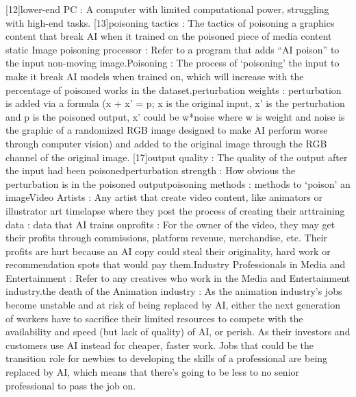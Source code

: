 [12]lower-end PC : A computer with limited computational power, struggling with high-end tasks.
[13]poisoning tactics : The tactics of poisoning a graphics content that break AI when it trained on the poisoned piece of media content \newline
[14]static Image poisoning processor : Refer to a program that adds “AI poison” to the input non-moving image.\newline
[15]Poisoning : The process of ‘poisoning’ the input to make it break AI models when trained on, which will increase with the percentage of poisoned works in the dataset.\newline
[16]perturbation weights : perturbation is added via a formula (x + x’ = p; x is the original input, x’ is the perturbation and p is the poisoned output, x’ could be w*noise where w is weight and noise is the graphic of a randomized RGB image designed to make AI perform worse through computer vision) and added to the original image through the RGB channel of the original image.
[17]output quality : The quality of the output after the input had been poisoned\newline
[18]perturbation strength : How obvious the perturbation is in the poisoned output\newline
[19]poisoning methods : methods to ‘poison’ an image\newline
[20]Video Artists : Any artist that create video content, like animators or illustrator art timelapse where they post the process of creating their art\newline
[21]training data : data that AI trains on\newline
[22]profits : For the owner of the video, they may get their profits through commissions, platform revenue, merchandise, etc. Their profits are hurt because an AI copy could steal their originality, hard work or recommendation spots that would pay them.\newline
[23]Industry Professionals in Media and Entertainment : Refer to any creatives who work in the Media and Entertainment industry.\newline
[24]the death of the Animation industry : As the animation industry’s jobs become unstable and at risk of being replaced by AI, either the next generation of workers have to sacrifice their limited resources to compete with the availability and speed (but lack of quality) of AI, or perish. As their investors and customers use AI instead for cheaper, faster work. Jobs that could be the transition role for newbies to developing the skills of a professional are being replaced by AI, which means that there’s going to be less to no senior professional to pass the job on.\newline
